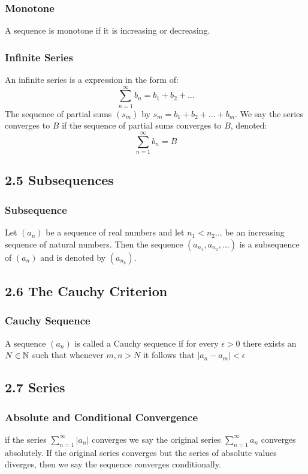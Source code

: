 \documentclass{article}
\begin{document}
\subsubsection*{Monotone}
A sequence is monotone if it is increasing or decreasing.

\subsubsection*{Infinite Series}
An infinite series is a expression in the form of:
\begin{equation*}
\sum_{n=1}^{\infty} b_n = b_1 + b_2 + ...
\end{equation*}
The sequence of partial sums $(s_m)$ by $s_m = b_1 + b_2 + ... + b_m$. We say the series converges to $B$ if the sequence of partial sums converges to $B$, denoted:
\begin{equation*}
\sum_{n=1}^{\infty} b_n = B
\end{equation*}

\subsection*{2.5 Subsequences}
\subsubsection*{Subsequence}
Let $(a_n)$ be a sequence of real numbers and let $n_1 < n_2 ...$ be an increasing sequence of natural numbers.
Then the sequence $(a_{n_1}, a_{n_2},...)$ is a subsequence of $(a_n)$ and is denoted by $(a_{n_k})$.

\subsection*{2.6 The Cauchy Criterion}
\subsubsection*{Cauchy Sequence}
A sequence $(a_n)$ is called a Cauchy sequence if for every $\epsilon > 0$ there exists an $N \in \protect\mathbb{N}$ such that whenever $m,n>N$ it follows that $|a_n -a_m|<\epsilon$

\subsection*{2.7 Series}
\subsubsection*{Absolute and Conditional Convergence}
if the series $\sum_{n=1}^{\infty} |a_n|$ converges we say the original series $\sum_{n=1}^{\infty} a_n$ converges absolutely. If the original series converges but the series of absolute values diverges, then we say the sequence converges conditionally.
\end{document}
